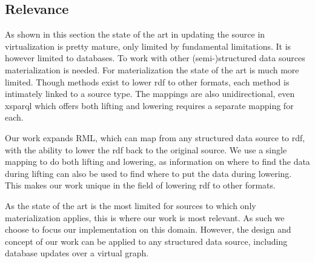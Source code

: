 \subsection{Relevance}
As shown in this section the state of the art in updating the source in virtualization is pretty mature, only limited by fundamental limitations. It is however limited to databases. To work with other (semi-)structured data sources materialization is needed. For materialization the state of the art is much more limited. Though methods exist to lower \acrshort{rdf} to other formats, each method is intimately linked to a source type. The mappings are also unidirectional, even \acrshort{xsparql} which offers both lifting and lowering requires a separate mapping for each.

Our work expands RML, which can map from any structured data source to \acrshort{rdf}, with the ability to lower the \acrshort{rdf} back to the original source. We use a single mapping to do both lifting and lowering, as information on where to find the data during lifting can also be used to find where to put the data during lowering. This makes our work unique in the field of lowering \acrshort{rdf} to other formats.

As the state of the art is the most limited for sources to which only materialization applies, this is where our work is most relevant. As such we choose to focus our implementation on this domain. However, the design and concept of our work can be applied to any structured data source, including database updates over a virtual graph.


